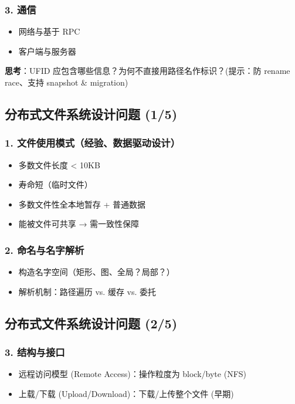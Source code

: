\subsubsection{3. 通信}
\begin{itemize}
    \item 网络与基于 RPC
    \item 客户端与服务器
\end{itemize}

\textbf{思考}：UFID 应包含哪些信息？为何不直接用路径名作标识？(提示：防 rename race、支持 snapshot \& migration)

\subsection{分布式文件系统设计问题 (1/5)}

\subsubsection{1. 文件使用模式（经验、数据驱动设计）}
\begin{itemize}
    \item 多数文件长度 < 10KB
    \item 寿命短（临时文件）
    \item 多数文件性全本地暂存 + 普通数据
    \item 能被文件可共享 → 需一致性保障
\end{itemize}

\subsubsection{2. 命名与名字解析}
\begin{itemize}
    \item 构造名字空间（矩形、图、全局？局部？）
    \item 解析机制：路径遍历 vs. 缓存 vs. 委托
\end{itemize}

\subsection{分布式文件系统设计问题 (2/5)}

\subsubsection{3. 结构与接口}
\begin{itemize}
    \item 远程访问模型 (Remote Access)：操作粒度为 block/byte (NFS)
    \item 上载/下载 (Upload/Download)：下载/上传整个文件 (早期)
\end{itemize}

